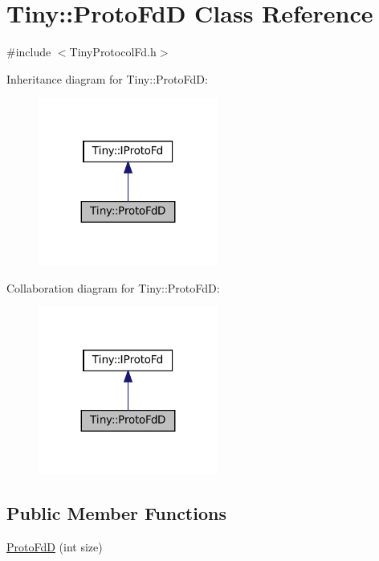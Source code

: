 \hypertarget{classTiny_1_1ProtoFdD}{}\section{Tiny\+:\+:Proto\+FdD Class Reference}
\label{classTiny_1_1ProtoFdD}


{\ttfamily \#include $<$Tiny\+Protocol\+Fd.\+h$>$}



Inheritance diagram for Tiny\+:\+:Proto\+FdD\+:
\nopagebreak
\begin{figure}[H]
\begin{center}
\leavevmode
\includegraphics[width=167pt]{classTiny_1_1ProtoFdD__inherit__graph}
\end{center}
\end{figure}


Collaboration diagram for Tiny\+:\+:Proto\+FdD\+:
\nopagebreak
\begin{figure}[H]
\begin{center}
\leavevmode
\includegraphics[width=167pt]{classTiny_1_1ProtoFdD__coll__graph}
\end{center}
\end{figure}
\subsection*{Public Member Functions}
\begin{DoxyCompactItemize}
\item 
\hyperlink{classTiny_1_1ProtoFdD_ac6d3b1143cb0776b9ae16e57068f03dc}{Proto\+FdD} (int size)
\end{DoxyCompactItemize}
